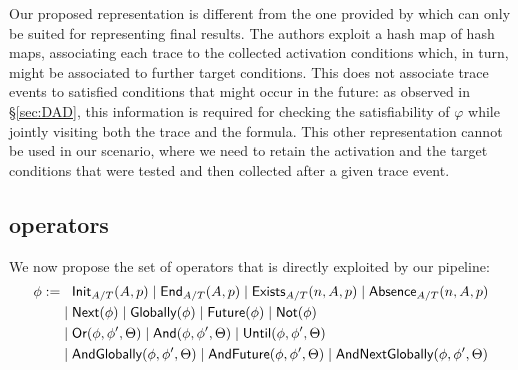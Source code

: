 Our proposed representation is different from the one provided by \cite{BurattinMS16} which can only be suited for representing final results. The authors exploit 
a hash map of hash maps, associating  each trace to the collected activation conditions which, in turn, might be associated to further target conditions. %
This does not associate trace events to satisfied conditions that might occur in the future: %
as observed in \S\ref{sec:DAD}, this information is required for checking the satisfiability of $\varphi$ while jointly visiting both the trace and the formula. This other representation cannot be used in our scenario, where we need to retain the activation and the target conditions that were tested and then collected after a given trace event.



\subsection{\xLTLf operators}\label{sec:xltlf}

We now propose the set of operators that is directly exploited by our pipeline:
\[\begin{split}
\phi:=&\;\;\;\textsf{Init}_{A/T}(A,p)\;|\;\textsf{End}_{A/T}(A,p)\;|\;\textsf{Exists}_{A/T}(n,A,p)\;|\;\textsf{Absence}_{A/T}(n,A,p)\\
     &\;|\; \textsf{Next}(\phi)\;|\; \textsf{Globally}(\phi)\;|\; \textsf{Future}(\phi)\;|\; \textsf{Not}(\phi)\\
     &\;|\; \textsf{Or}(\phi,\phi',\Theta)\;|\; \textsf{And}(\phi,\phi',\Theta)\;|\; \textsf{Until}(\phi,\phi',\Theta)\\
     &\;|\; \textsf{AndGlobally}(\phi,\phi',\Theta)\;|\; \textsf{AndFuture}(\phi,\phi',\Theta)\;|\; \textsf{AndNextGlobally}(\phi,\phi',\Theta)\\
\end{split}\]

